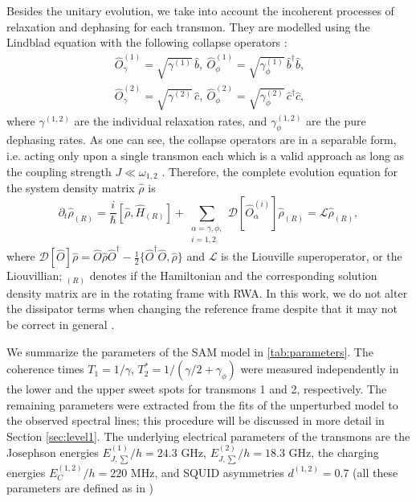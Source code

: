 \documentclass[%
 aps, prx,
 amsmath,amssymb,
 reprint,%
superscriptaddress
]{revtex4-2}
\begin{document}
Besides the unitary evolution, we take into 
account the incoherent processes of relaxation 
and dephasing for each transmon. They are 
modelled using the Lindblad equation with the 
following collapse 
operators \cite{bishop2010circuit}:
\begin{equation}\
\begin{split}
\hat{{O}}_{\gamma}^{(1)} = \sqrt{\gamma^{(1)}}\, \hat b,\ 
\hat{{O}}_{\phi}^{(1)} = \sqrt{\gamma_{\phi}^{(1)}}\, 
\hat b^\dag \hat b,\\
\hat{{O}}_{\gamma}^{(2)} = \sqrt{\gamma^{(2)}}\, \hat c,\ 
\hat{{O}}_{\phi}^{(2)} = \sqrt{\gamma_{ \phi}^{(2)}}\, 
\hat c^\dag \hat c,
\end{split}
\end{equation}
where $\gamma^{(1,2)}$ are the individual 
relaxation rates, and $\gamma_{\phi}^{(1,2)}$ are 
the pure dephasing rates. As one can see, the 
collapse operators are in a separable form, i.e. 
acting only upon a single transmon each which is 
a valid approach as long as the coupling strength $J \ll \omega_{1,2}$ 
 \cite{beaudoin2011dissipation}. 
Therefore, the complete evolution equation for 
the system density matrix $\hat \rho$ is		
\begin{equation}
\partial_t \hat \rho_{(R)} = \frac{i}{\hbar}[\hat 
\rho, \hat H_{(R)}] + \sum_{\substack{\alpha = {\gamma, \phi},\\ i=1,2}} 
\mathcal{D}[\hat{O}_{\alpha}^{(i)}] \hat \rho_{(R)} 
= \mathcal{L}\hat\rho_{(R)}, \label{eq:master}
\end{equation}
where $\mathcal{D}[\hat{{O}}]\hat \rho = 
\hat{{O}} \hat \rho \hat{{O}}^\dag - 
\frac{1}{2}\{ \hat{{O}}^\dag \hat{{O}}, \hat 
\rho\}$ and $\mathcal{L}$ is the Liouville 
superoperator, or the Liouvillian; $_{(R)}$ 
denotes if the Hamiltonian and the corresponding 
solution density matrix are in the rotating frame 
with RWA. In this work, we do not alter the 
dissipator terms when changing the reference 
frame despite that it may not be correct in 
general \cite{shavit2019bridging}.

We summarize the parameters of the SAM model in \autoref{tab:parameters}. The coherence times $T_1 = 1/\gamma$, $T_2^{*} = 1/(\gamma/2 + \gamma_{\phi})$ were measured independently in the lower and the upper sweet spots for transmons 1 and 2, respectively. The remaining parameters were extracted from the fits of the unperturbed model to the observed spectral lines; this procedure will be discussed in more detail in Section \ref{sec:level1}. The underlying electrical parameters of the transmons are the Josephson energies $E^{(1)}_{J, 
\sum}/h = 24.3$ GHz, $E^{(2)}_{J,\sum}/h = 18.3$ GHz,  the charging energies $E^{(1,2)}_C/h = 220$ MHz, and SQUID asymmetries $d^{(1,2)} = 0.7$ (all these parameters are defined as in \cite{koch2007charge})
\end{document}
